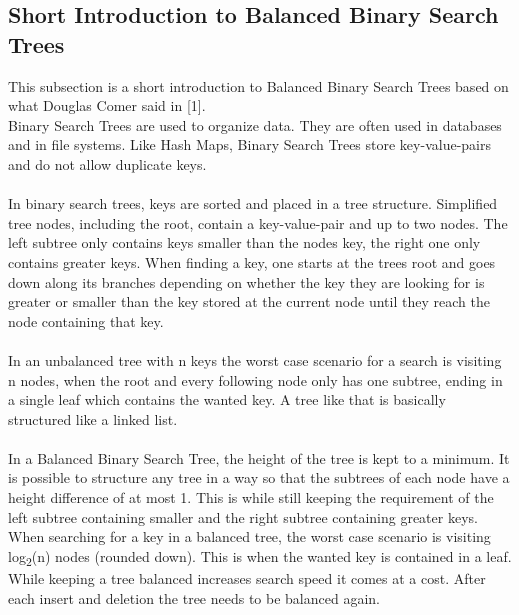 \subsection{Short Introduction to Balanced Binary Search Trees}
This subsection is a short introduction to Balanced Binary Search Trees based on what Douglas Comer said in [1].\\
Binary Search Trees are used to organize data. They are often used in databases and in file systems. Like Hash Maps, Binary Search Trees store key-value-pairs and do not allow duplicate keys.\\\\
In binary search trees, keys are sorted and placed in a tree structure. Simplified tree nodes, including the root, contain a key-value-pair and up to two nodes. The left subtree only contains keys smaller than the nodes key, the right one only contains greater keys. When finding a key, one starts at the trees root and goes down along its branches depending on whether the key they are looking for is greater or smaller than the key stored at the current node until they reach the node containing that key.\\\\
In an unbalanced tree with n keys the worst case scenario for a search is visiting n nodes, when the root and every following node only has one subtree, ending in a single leaf which contains the wanted key. A tree like that is basically structured like a linked list.\\\\
In a Balanced Binary Search Tree, the height of the tree is kept to a minimum. It is possible to structure any tree in a way so that the subtrees of each node have a height difference of at most 1.
This is while still keeping the requirement of the left subtree containing smaller and the right subtree containing greater keys.\\
When searching for a key in a balanced tree, the worst case scenario is visiting log\textsubscript{2}(n) nodes (rounded down). This is when the wanted key is contained in a leaf.\\ While keeping a tree balanced increases search speed it comes at a cost. After each insert and deletion the tree needs to be balanced again.\\ 